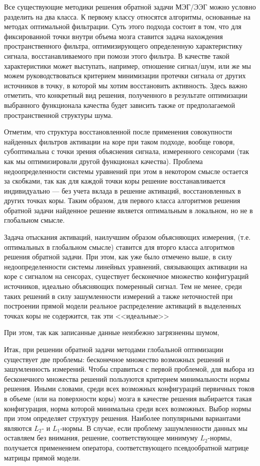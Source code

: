 Все существующие методики решения обратной задачи МЭГ/ЭЭГ можно условно разделить на два класса.
К первому классу относятся алгоритмы, основанные на методах оптимальной фильтрации.
Суть этого подхода состоит в том, что для фиксированной точки внутри объема мозга ставится задача нахождения
пространственного фильтра, оптимизирующего определенную характеристику сигнала,
восстанавливаемого при помози этого фильтра.
В качестве такой характеристики может выступать, например, отношение сигнал/шум,
или же мы можем руководствоваться критерием минимизации протечки сигнала от других источников в точку,
в которой мы хотим восстановить активность.
Здесь важно отметить, что конкретный вид решения, полученного в результате оптимизации выбранного
функционала качества будет зависить также от предполагаемой пространственной структуры шума.

Отметим, что структура восстановленной после применения совокупности найденных фильтров
активации на коре при таком подходе, вообще говоря, субоптимальна с точки зрения объяснения сигнала,
измеренного сенсорами (так как мы оптимизировали другой функционал качества).
Проблема недоопределенности системы уравнений при этом в некотором смысле остается за скобками,
так как для каждой точки коры решение восстанавливается индивидуально ---
без учета вклада в решение активаций, восстановленных в других точках коры.
Таким образом, для первого класса алгоритмов решения обратной задачи найденное решение
является оптимальным в локальном, но не в глобальном смысле.

Задача отыскания активаций, наилучшим образом объясняющих измерения, (т.е. оптимальных в глобальном смысле)
ставится для вторго класса алгоритмов решения обратной задачи.
При этом, как уже было отмечено выше, в силу недоопределенности системы линейных уравнений,
связывающих активации на коре с сигналом на сенсорах, существует бесконечное множество
конфигураций источников, идеально объясняющих померенный сигнал.
Тем не менее, среди таких решений в силу зашумленности измерений а также неточностей
при построении прямой модели реальное распределение активаций в выделенных точках коры
не содержится, так эти <<идеальные>> 

При этом, так как записанные данные неизбежно загрязненны шумом, 


Итак, при решении обратной задачи методами глобальной оптимизации существует две проблемы:
бесконечное множество возможных решений и зашумленность измерений. Чтобы справиться с первой проблемой,
для выбора из бесконечного множества решений пользуются критерием минимальности нормы решения.
Иными словами, среди всех возможных конфигураций первичных токов в объеме (или на поверхности коры) мозга
в качестве решения выбирается такая конфигурация, норма которой минимальна среди всех возможных.
Выбор нормы при этом определяет структуру решения.
Наиболее популярными вариантами являются $L_2$- и $L_1$-нормы.
В случае, если проблему зашумленности данных мы оставляем без внимания, решение, соответствующее
минимуму $L_2$-нормы, получается применением оператора,
соответствующего псевдообратной матрице матрицы прямой модели.



